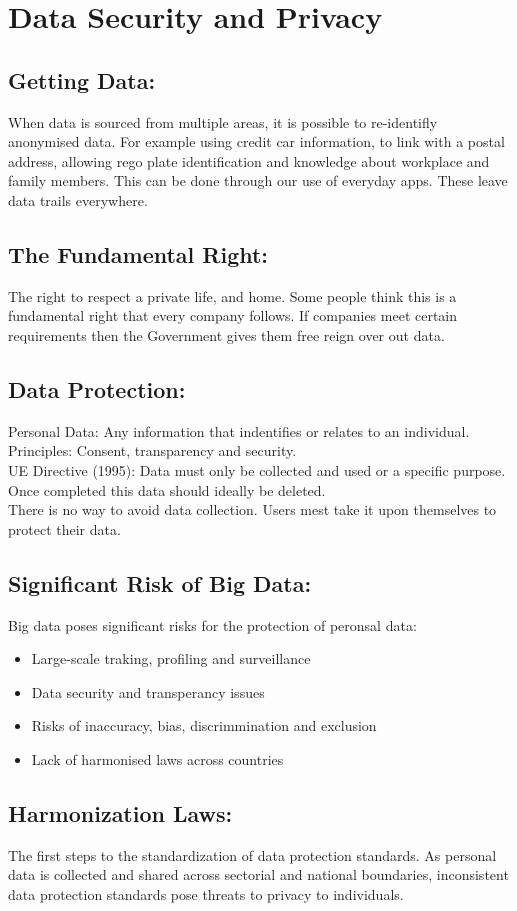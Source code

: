 \documentclass[a5paper]{article}
\begin{document}
	\section{Data Security and Privacy}
	\subsection{Getting Data:}
	When data is sourced from multiple areas, it is possible to re-identifly anonym\-ised data. For example using credit car information, to link with a postal address, allowing rego plate identification and knowledge about workplace and family members. This can be done through our use of everyday apps. These leave data trails everywhere.
	\subsection{The Fundamental Right:}
	The right to respect a private life, and home. Some people think this is a fundamental right that every company follows. If companies meet certain requirements then the Government gives them free reign over out data.
	\subsection{Data Protection:}
	Personal Data: Any information that indentifies or relates to an individual.\\
	Principles: Consent, transparency and security.\\
	UE Directive (1995): Data must only be collected and used or a specific purpose. Once completed this data should ideally be deleted.\\[1\baselineskip]
	There is no way to avoid data collection. Users mest take it upon themselves to protect their data.
	\subsection{Significant Risk of Big Data:}
	Big data poses significant risks for the protection of peronsal data:
	\begin{itemize}
		\item Large-scale traking, profiling and surveillance
		\item Data security and transperancy issues
		\item Risks of inaccuracy, bias, discrimmination and exclusion
		\item Lack of harmonised laws across countries
	\end{itemize}
	\subsection{Harmonization Laws:}
	The first steps to the standardization of data protection standards. As personal data is collected and shared across sectorial and national boundaries, inconsistent data protection standards pose threats to privacy to individuals.
\end{document}
